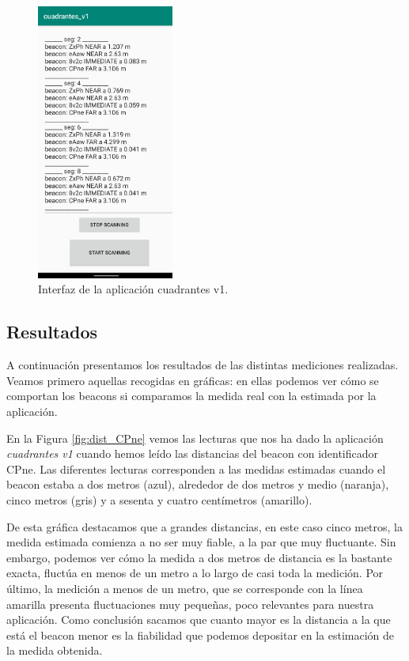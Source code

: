 \begin{figure}[t]
	\centering
	\includegraphics[width=0.4\textwidth]{Imagenes/Descripciondeltrabajo/cuadrantes_v1}
	\caption{Interfaz de la aplicación cuadrantes v1.}
	\label{fig:cuadrantesv1}
\end{figure}


\subsection{Resultados}

A continuación presentamos los resultados de las distintas mediciones realizadas. Veamos primero  aquellas recogidas en gráficas: en ellas podemos ver cómo se comportan los beacons si comparamos la medida real con la estimada por la aplicación. 

En la Figura \ref{fig:dist_CPne} vemos las lecturas que nos ha dado la aplicación \textit{cuadrantes v1} cuando hemos leído las distancias del beacon con identificador CPne. Las diferentes lecturas corresponden a las medidas estimadas cuando el beacon estaba a dos metros (azul), alrededor de dos metros y medio (naranja), cinco metros (gris) y a sesenta y cuatro centímetros (amarillo).

De esta gráfica destacamos que a grandes distancias, en este caso cinco metros, la medida estimada comienza a no ser muy fiable, a la par que muy fluctuante. Sin embargo, podemos ver cómo la medida a dos metros de distancia es la bastante exacta, fluctúa en menos de un metro a lo largo de casi toda la medición. Por último, la medición a menos de un metro, que se corresponde con la línea amarilla presenta fluctuaciones muy pequeñas, poco relevantes para nuestra aplicación. Como conclusión sacamos que cuanto mayor es la distancia a la que está el beacon menor es la fiabilidad  que podemos depositar en la estimación de la medida obtenida. 


